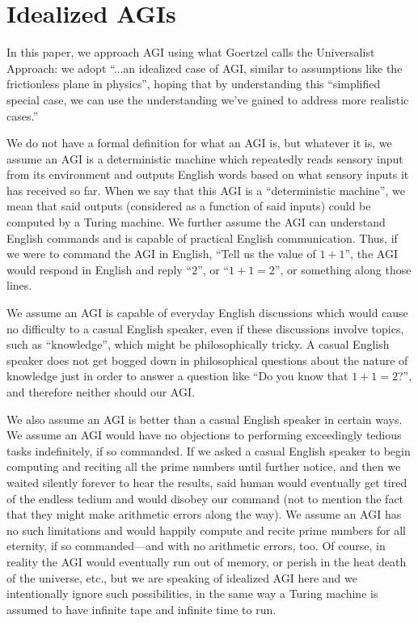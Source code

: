 \documentclass[runningheads]{llncs}
\begin{document}
\section{Idealized AGIs}
\label{agisection}

In this paper, we approach AGI using what
Goertzel \cite{goertzel2014artificial} calls
the Universalist Approach:
we adopt ``...an idealized case of AGI, similar to
assumptions like the frictionless plane in physics'', hoping that by
understanding this ``simplified special
case, we can use the understanding we've gained to address more realistic
cases.''

We do not have a formal definition for what an AGI is, but whatever it is,
we assume an AGI is a deterministic machine
which repeatedly reads sensory input from its environment and outputs
English words based on what sensory inputs it has received so far.
When we say that this AGI is a ``deterministic machine'', we mean that
said outputs (considered as a function of said inputs) could be computed
by a Turing machine. We further assume the AGI can understand English
commands and is capable of practical English communication. Thus, if
we were to command the AGI in English, ``Tell us the value of $1+1$'',
the AGI would respond in English and reply ``$2$'', or ``$1+1=2$'',
or something along those lines.

We assume an AGI is capable of everyday English discussions
which would cause no difficulty to a casual English speaker, even if
these discussions involve topics, such as ``knowledge'', which
might be philosophically tricky. A casual English speaker does not get
bogged down in philosophical questions about the nature of knowledge
just in order to answer a question like ``Do you know that $1+1=2$?'',
and therefore neither should our AGI.

We also assume an AGI is better than a casual English speaker in certain ways.
We assume an AGI would have no objections to performing exceedingly tedious
tasks indefinitely, if so commanded. If we asked a casual English speaker to
begin computing and reciting all the prime numbers until further notice, and
then we waited silently forever to hear the results, said human would eventually
get tired of the endless tedium and would disobey our command (not to mention
the fact that they might make arithmetic errors along the way). We assume an AGI
has no such limitations and would happily compute and recite prime numbers for
all eternity, if so commanded---and with no arithmetic errors, too. Of course,
in reality the AGI would eventually run out of memory, or perish in the heat
death of the universe, etc., but we are speaking of idealized AGI here and we
intentionally ignore such possibilities, in the same way a Turing machine is
assumed to have infinite tape and infinite time to run.
\end{document}

